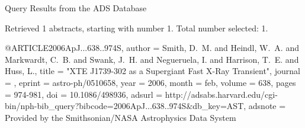 Query Results from the ADS Database


Retrieved 1 abstracts, starting with number 1.  Total number selected: 1.

@ARTICLE{2006ApJ...638..974S,
   author = {{Smith}, D.~M. and {Heindl}, W.~A. and {Markwardt}, C.~B. and 
	{Swank}, J.~H. and {Negueruela}, I. and {Harrison}, T.~E. and 
	{Huss}, L.},
    title = "{XTE J1739-302 as a Supergiant Fast X-Ray Transient}",
  journal = {\apj},
   eprint = {astro-ph/0510658},
     year = 2006,
    month = feb,
   volume = 638,
    pages = {974-981},
      doi = {10.1086/498936},
   adsurl = {http://adsabs.harvard.edu/cgi-bin/nph-bib_query?bibcode=2006ApJ...638..974S&db_key=AST},
  adsnote = {Provided by the Smithsonian/NASA Astrophysics Data System}
}


